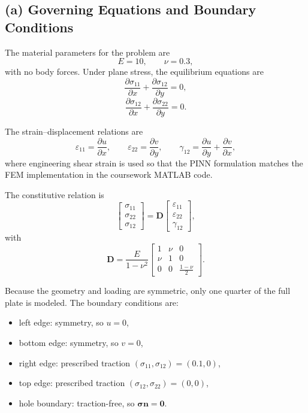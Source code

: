 \documentclass[11pt]{article}
\begin{document}
\subsection*{(a) Governing Equations and Boundary Conditions}

The material parameters for the problem are
\[
E = 10, \qquad \nu = 0.3,
\]
with no body forces. Under plane stress, the equilibrium equations are
\[
\frac{\partial \sigma_{11}}{\partial x} + \frac{\partial \sigma_{12}}{\partial y} = 0,
\]
\[
\frac{\partial \sigma_{12}}{\partial x} + \frac{\partial \sigma_{22}}{\partial y} = 0.
\]

The strain--displacement relations are
\[
\varepsilon_{11} = \frac{\partial u}{\partial x}, \qquad
\varepsilon_{22} = \frac{\partial v}{\partial y}, \qquad
\gamma_{12} = \frac{\partial u}{\partial y} + \frac{\partial v}{\partial x},
\]
where engineering shear strain is used so that the PINN formulation matches the FEM implementation in the coursework MATLAB code.

The constitutive relation is
\[
\begin{bmatrix}
\sigma_{11} \\
\sigma_{22} \\
\sigma_{12}
\end{bmatrix}
=
\mathbf{D}
\begin{bmatrix}
\varepsilon_{11} \\
\varepsilon_{22} \\
\gamma_{12}
\end{bmatrix},
\]
with
\[
\mathbf{D}
=
\frac{E}{1-\nu^2}
\begin{bmatrix}
1 & \nu & 0 \\
\nu & 1 & 0 \\
0 & 0 & \frac{1-\nu}{2}
\end{bmatrix}.
\]

Because the geometry and loading are symmetric, only one quarter of the full plate is modeled. The boundary conditions are:
\begin{itemize}[itemsep=0.25em]
    \item left edge: symmetry, so \(u = 0\),
    \item bottom edge: symmetry, so \(v = 0\),
    \item right edge: prescribed traction \((\sigma_{11}, \sigma_{12}) = (0.1, 0)\),
    \item top edge: prescribed traction \((\sigma_{12}, \sigma_{22}) = (0, 0)\),
    \item hole boundary: traction-free, so \(\boldsymbol{\sigma}\mathbf{n} = \mathbf{0}\).
\end{itemize}
\end{document}
